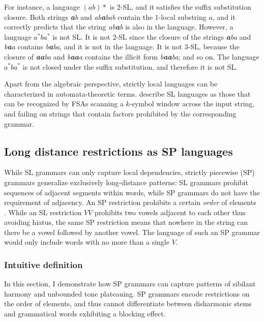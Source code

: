 For instance, a language $(ab)*$ is $2$-SL, and it satisfies the suffix substitution closure.
Both strings \emph{\textbf{a}b} and \emph{ab\textbf{a}bab} contain the $1$-local substring $a$, and it correctly predicts that the string \emph{ab\textbf{a}b} is also in the language.
However, a language $a^*ba^*$ is not SL.
It is not $2$-SL since the closure of the strings \emph{\textbf{a}ba} and  \emph{b\textbf{a}a} contains \emph{b\textbf{a}ba}, and it is not in the language.
It is not $3$-SL, because the closure of \emph{\textbf{aa}ba} and \emph{b\textbf{aa}a} contains the illicit form \emph{b\textbf{aa}ba}; and so on.
The language $a^*ba^*$ is not closed under the suffix substitution, and therefore it is not SL.

Apart from the algebraic perspective, strictly local languages can be characterized in automata-theoretic terms.
\cite{RogersPullum2011} describe SL languages as those that can be recognized by FSAs scanning a $k$-symbol window across the input string, and failing on strings that contain factors prohibited by the corresponding grammar.


\subsection{Long distance restrictions as SP languages}
\label{SPldrestrictions}


While SL grammars can only capture local dependencies, strictly piecewise (SP) grammars generalize exclusively long-distance patterns: %
SL grammars prohibit sequences of adjacent segments within words, while SP grammars do not have the requirement of adjacency.
An SP restriction prohibits a certain \emph{order} of elements \citep{Rogers-HeinzEtAl-2010-LPTSS,Fu2011}. 
While an SL restriction $VV$ prohibits two vowels adjacent to each other thus avoiding hiatus, the same SP restriction means that nowhere in the string can there be a vowel followed by another vowel.
The language of such an SP grammar would only include words with no more than a single $V$.


\subsubsection{Intuitive definition}

In this section, I demonstrate how SP grammars can capture patterns of sibilant harmony and unbounded tone plateauing.
SP grammars encode restrictions on the order of elements, and thus cannot differentiate between disharmonic stems and grammatical words exhibiting a blocking effect.





